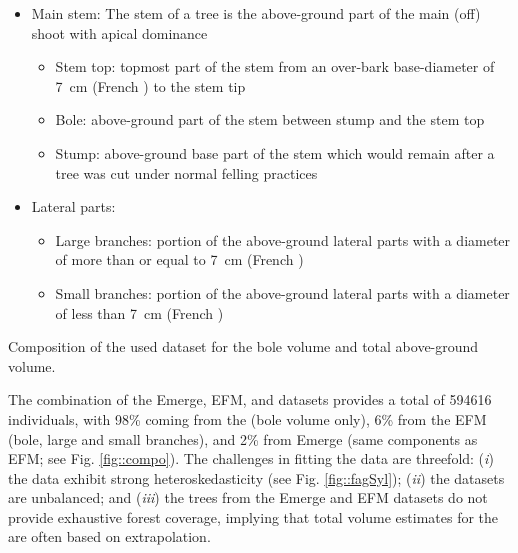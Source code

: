 \begin{itemize}
	\item Main stem: The stem of a tree is the above-ground part of the main (off) shoot with apical dominance
	\begin{itemize}
		\item Stem top: topmost part of the stem from an over-bark base-diameter of \qty{7}{\centi\metre} (French \NFI) to the stem tip
		\item Bole: above-ground part of the stem between stump and the stem top
		\item Stump: above-ground base part of the stem which would remain after a tree was cut under normal felling practices
	\end{itemize}
	\item Lateral parts:
	\begin{itemize}
		\item Large branches: portion of the above-ground lateral parts with a diameter of more than or equal to \qty{7}{\centi\metre} (French \NFI)
		\item Small branches: portion of the above-ground lateral parts with a diameter of less than \qty{7}{\centi\metre} (French \NFI)
	\end{itemize}
\end{itemize}

\begin{marginfigure}
	\centering
	
	\caption{Composition of the used dataset for the bole volume and total above-ground volume.\label{fig::compo}}
\end{marginfigure}
The combination of the Emerge, EFM, and \NFI{} datasets provides a total of \num{594616} individuals, with 98\% coming from the \NFI{} (bole volume only), 6\% from the EFM (bole, large and small branches), and 2\% from Emerge (same components as EFM; see Fig. \ref{fig::compo}). The challenges in fitting the data are threefold: (\textit{i}) the data exhibit strong heteroskedasticity (see Fig. \ref{fig::fagSyl}); (\textit{ii}) the datasets are unbalanced; and (\textit{iii}) the trees from the Emerge and EFM datasets do not provide exhaustive forest coverage, implying that total volume estimates for the \NFI{} are often based on extrapolation.

